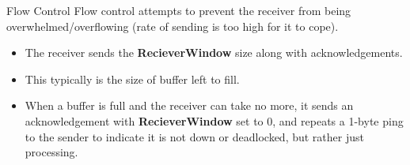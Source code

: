 \begin{definitionbox}{Flow Control}
    Flow control attempts to prevent the receiver from being overwhelmed/overflowing (rate of sending is too high for it to cope).
    \begin{itemize}
        \setlength\itemsep{0em}
        \item The receiver sends the \textbf{RecieverWindow} size along with acknowledgements.
        \item This typically is the size of buffer left to fill.
        \item When a buffer is full and the receiver can take no more, it sends an acknowledgement with \textbf{RecieverWindow} set to $0$, and repeats a 1-byte ping to the sender to indicate it is not down or deadlocked, but rather just processing.
    \end{itemize}
\end{definitionbox}

